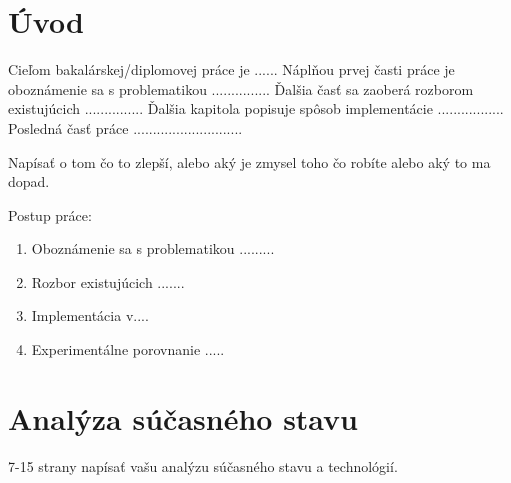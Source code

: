 \clearpage


\pagestyle{fancy}

\chapter*{Úvod}

Cieľom bakalárskej/diplomovej práce je ......
Náplňou prvej časti práce je oboznámenie sa s problematikou ...............
Ďalšia časť sa zaoberá rozborom existujúcich ............... Ďalšia kapitola popisuje spôsob implementácie ................. Posledná časť práce ............................

Napísať o tom čo to zlepší, alebo aký je zmysel toho čo robíte alebo aký to ma dopad.

\bigskip
Postup práce:

\begin{enumerate}
\item Oboznámenie sa s problematikou .........
\item Rozbor existujúcich .......
\item  Implementácia v....
\item  Experimentálne porovnanie .....
\end{enumerate}

\clearpage



\chapter{Analýza súčasného stavu}

7-15 strany napísať vašu analýzu súčasného stavu a technológií.

